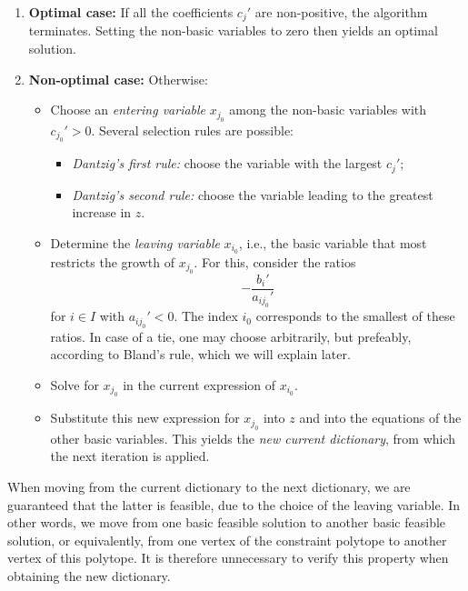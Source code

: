\begin{enumerate}
  \item \textbf{Optimal case:}  
  If all the coefficients $c_j'$ are non-positive, the algorithm terminates.  
  Setting the non-basic variables to zero then yields an optimal solution.

  \item \textbf{Non-optimal case:}  
  Otherwise:
  \begin{itemize}
    \item Choose an \emph{entering variable} $x_{j_0}$ among the non-basic variables with $c_{j_0}'>0$.  
    Several selection rules are possible:
    \begin{itemize}
      \item \emph{Dantzig's first rule:} choose the variable with the largest $c_j'$;
      \item \emph{Dantzig's second rule:} choose the variable leading to the greatest increase in $z$.
    \end{itemize}

    \item Determine the \emph{leaving variable} $x_{i_0}$, i.e., the basic variable that most restricts the growth of $x_{j_0}$.  
    For this, consider the ratios
    \[
       - \frac{b_i'}{a_{ij_0}'}
    \]
    for $i \in I$ with $a_{ij_0}' < 0$.  
    The index $i_0$ corresponds to the smallest of these ratios.  
    In case of a tie, one may choose arbitrarily, but prefeably, according to Bland's rule, which we will explain later.

    \item Solve for $x_{j_0}$ in the current expression of $x_{i_0}$.

    \item Substitute this new expression for $x_{j_0}$ into $z$ and into the equations of the other basic variables.  
    This yields the \emph{new current dictionary}, from which the next iteration is applied.
  \end{itemize}
\end{enumerate}

\begin{remark}
    When moving from the current dictionary to the next dictionary, we are guaranteed that the latter is feasible, due to the choice of the leaving variable. In other words, we move from one basic feasible solution to another basic feasible solution, or equivalently, from one vertex of the constraint polytope to another vertex of this polytope. It is therefore unnecessary to verify this property when obtaining the new dictionary.
\end{remark}

